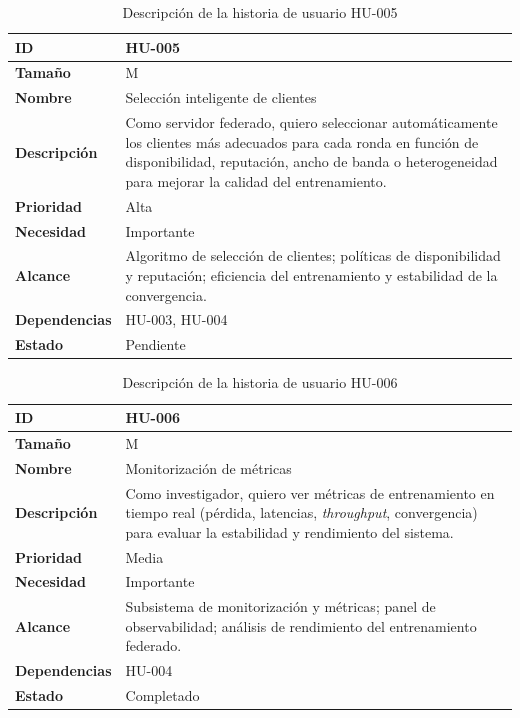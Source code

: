 \documentclass{report}
\begin{document}
\begin{table}[H]
\centering
\caption{Descripción de la historia de usuario HU-005}
\label{tab:hu005}
\begin{tabular}{|l|p{12cm}|}
\hline
\textbf{ID} & HU-005 \\ \hline
\textbf{Tamaño} & M \\ \hline
\textbf{Nombre} & Selección inteligente de clientes \\ \hline
\textbf{Descripción} & 
Como servidor federado, quiero seleccionar automáticamente los clientes más adecuados para cada ronda en función de disponibilidad, reputación, ancho de banda o heterogeneidad para mejorar la calidad del entrenamiento. \\ \hline
\textbf{Prioridad} & Alta \\ \hline
\textbf{Necesidad} & Importante \\ \hline
\textbf{Alcance} & Algoritmo de selección de clientes; políticas de disponibilidad y reputación; eficiencia del entrenamiento y estabilidad de la convergencia. \\ \hline
\textbf{Dependencias} & HU-003, HU-004 \\ \hline
\textbf{Estado} & Pendiente \\ \hline
\end{tabular}
\end{table}



\begin{table}[H]
\centering
\caption{Descripción de la historia de usuario HU-006}
\label{tab:hu006}
\begin{tabular}{|l|p{12cm}|}
\hline
\textbf{ID} & HU-006 \\ \hline
\textbf{Tamaño} & M \\ \hline
\textbf{Nombre} & Monitorización de métricas \\ \hline
\textbf{Descripción} & 
Como investigador, quiero ver métricas de entrenamiento en tiempo real (pérdida, latencias, \textit{throughput}, convergencia) para evaluar la estabilidad y rendimiento del sistema. \\ \hline
\textbf{Prioridad} & Media \\ \hline
\textbf{Necesidad} & Importante \\ \hline
\textbf{Alcance} & Subsistema de monitorización y métricas; panel de observabilidad; análisis de rendimiento del entrenamiento federado. \\ \hline
\textbf{Dependencias} & HU-004 \\ \hline
\textbf{Estado} & Completado \\ \hline
\end{tabular}
\end{table}
\end{document}
